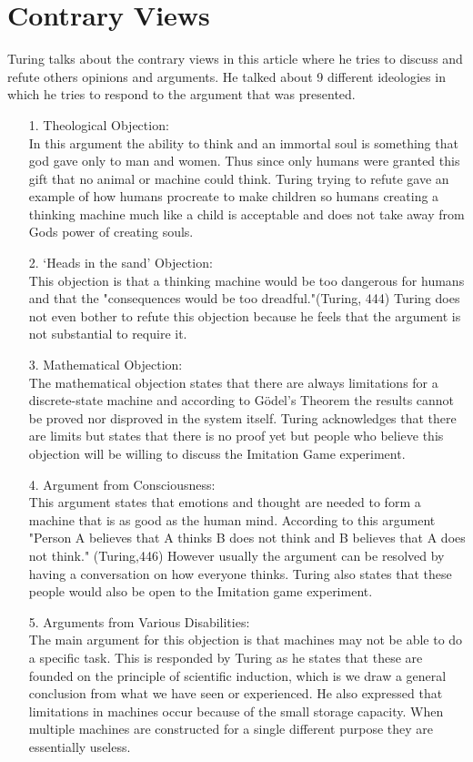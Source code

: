 \documentclass[journal, a4paper]{IEEEtran}
\begin{document}
\section{Contrary Views}
Turing talks about the contrary views in this article where he tries to discuss and refute others opinions and arguments. He talked about 9 different ideologies in which he tries to respond to the argument that was presented.
\begin{itemize}
\item[1.] Theological Objection:
 \\ In this argument the ability to think and an immortal soul is something that god gave only to man and women. Thus since only humans were granted this gift that no animal or machine could think. Turing trying to refute gave an example of how humans procreate to make children so humans creating a thinking machine much like a child is acceptable and does not take away from Gods power of creating souls.
\item[2.] `Heads in the sand' Objection:
	\\ This objection is that a thinking machine would be too dangerous for humans and that the "consequences would be too dreadful."(Turing, 444) Turing does not even bother to refute this objection because he feels that the argument is not substantial to require it.
\item[3.] Mathematical Objection:
	\\ The mathematical objection states that there are always limitations for a discrete-state machine and according to G\"{o}del's Theorem the results cannot be proved nor disproved in the system itself. Turing acknowledges that there are limits but states that there is no proof yet but people who believe this objection will be willing to discuss the Imitation Game experiment.
\item[4.] Argument from Consciousness:
	\\ This argument states that emotions and thought are needed to form a machine that is as good as the human mind. According to this argument "Person A believes that A thinks B does not think and B believes that A does not think." (Turing,446) However usually the argument can be resolved by having a conversation on how everyone thinks. Turing also states that these people would also be open to the Imitation game experiment.
\item[5.] Arguments from Various Disabilities:
	\\ The main argument for this objection is that machines may not be able to do a specific task. This is responded by Turing as he states that these are founded on the principle of scientific induction, which is we draw a general conclusion from what we have seen or experienced. He also expressed that limitations in machines occur because of the small storage capacity. When multiple machines are constructed for a single different purpose they are essentially useless.

\end{itemize}
\end{document}

